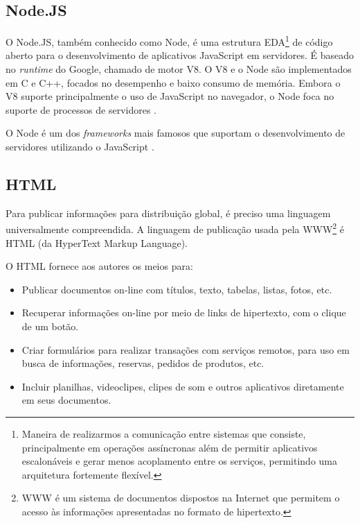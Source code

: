 
\subsection{Node.JS}

O Node.JS, também conhecido como Node, é uma estrutura EDA\footnote{Maneira de realizarmos a comunicação entre sistemas que consiste, principalmente em operações assíncronas além de permitir aplicativos escalonáveis e gerar menos acoplamento entre os serviços, permitindo uma arquitetura fortemente flexível.} de código aberto para o desenvolvimento de aplicativos JavaScript em servidores. É baseado no \textit{runtime} do Google, chamado de motor V8. O V8 e o Node são implementados em C e C++, focados no desempenho e baixo consumo de memória. Embora o V8 suporte principalmente o uso de JavaScript no navegador, o Node foca no suporte de processos de servidores \cite{Tilkov2010}.

O Node é um dos \textit{frameworks} mais famosos que suportam o desenvolvimento de servidores utilizando o JavaScript \cite{Tilkov2010}.


\subsection{HTML}

Para publicar informações para distribuição global, é preciso uma linguagem universalmente compreendida. A linguagem de publicação usada pela WWW\footnote{WWW é um sistema de documentos dispostos na Internet que permitem o acesso às informações apresentadas no formato de hipertexto.} é HTML (da HyperText Markup Language).\citeauthor{html}

O HTML fornece aos autores os meios para: 
\begin{itemize}
    \item Publicar documentos on-line com títulos, texto, tabelas, listas, fotos, etc. 
    \item Recuperar informações on-line por meio de links de hipertexto, com o clique de um botão. 
    \item Criar formulários para realizar transações com serviços remotos, para uso em busca de informações, reservas, pedidos de produtos, etc. 
    \item Incluir planilhas, videoclipes, clipes de som e outros aplicativos diretamente em seus documentos.
\end{itemize}

